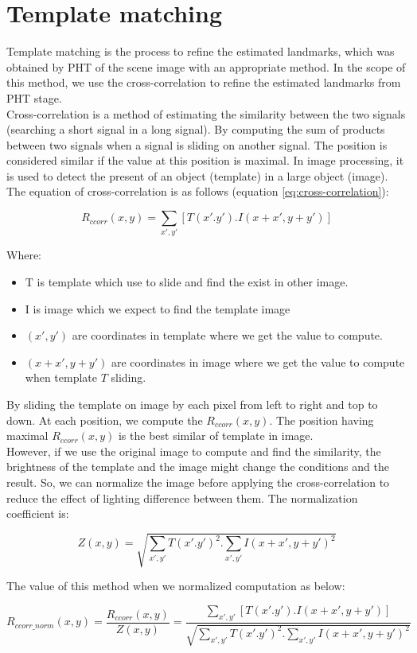\section{Template matching}
Template matching is the process to refine the estimated landmarks, which was obtained by PHT of the scene image with an appropriate method. In the scope of this method, we use the cross-correlation to refine the estimated landmarks from PHT stage.\\[0.2cm]
Cross-correlation is a method of estimating the similarity between the two signals (searching a short signal in a long signal). By computing the sum of products between two signals when a signal is sliding on another signal. The position is considered similar if the value at this position is maximal. In image processing, it is used to detect the present of an object (template) in a large object (image). The equation of cross-correlation is as follows (equation \ref{eq:cross-correlation}):
\begin{center}
\begin{equation}\label{eq:cross-correlation}
R_{ccorr}(x,y) = \sum\limits_{x',y'}[T(x'.y').I(x + x', y + y')]
\end{equation}
\end{center}
Where:
\begin{itemize}
\item T is template which use to slide and find the exist in other image.
\item I is image which we expect to find the template image
\item $(x', y')$ are coordinates in template where we get the value to compute.
\item $(x + x', y + y')$ are coordinates in image where we get the value to compute when template $T$ sliding.
\end{itemize}
By sliding the template on image by each pixel from left to right and top to down. At each position, we compute the $R_{ccorr}(x,y)$. The position having maximal $R_{ccorr}(x,y)$ is the best similar of template in image.\\[0.2cm]
However, if we use the original image to compute and find the similarity, the brightness of the template and the image might change the conditions and the result. So, we can normalize the image before applying the cross-correlation to reduce the effect of lighting difference between them. The normalization coefficient is:
\begin{center}
\begin{equation}\label{eq:normalizeCoff}
Z(x,y) = \sqrt{\sum\limits_{x',y'}T(x'.y')^{2}.\sum\limits_{x',y'}I(x + x', y + y')^{2}}
\end{equation}
\end{center}
The value of this method when we normalized computation as below:
\begin{center}
\begin{equation}\label{eq:cross-correlation}
R_{ccorr\_norm}(x,y) =\frac{R_{ccorr}(x,y)}{Z(x,y)} = \frac{\sum\limits_{x',y'}[T(x'.y').I(x + x', y + y')]}{\sqrt{\sum\limits_{x',y'}T(x'.y')^{2}.\sum\limits_{x',y'}I(x + x', y + y')^{2}}}
\end{equation}
\end{center}
